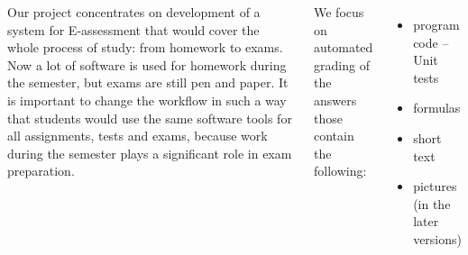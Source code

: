 \documentclass[25pt, 
               a0paper, 
               portraitmargin = 0mm, 
               margin = 0mm,
               innermargin = 50mm,
               blockverticalspace = 1mm,
               colspace = 40mm,
               subcolspace = 8mm]
               {tikzposter}
\begin{document}
 \vspace{1cm}
\begin{columns}
   
    {
		\LARGE
{Our project concentrates on development of a system
for E-assessment that would cover the whole process
of study: from homework to exams. Now a lot of
software is used for homework during the semester, but
exams are still pen and paper. It is important to change
the workflow in such a way that students would use the
same software tools for all assignments, tests and
exams, because work during the semester plays a
significant role in exam preparation.}
    }
    
    {
    





\LARGE

We focus on automated grading of the answers those
contain the following:
\begin{itemize}
\item program code -- Unit tests
\item formulas
\item short text
\item pictures (in the later versions)
\end{itemize}

}
\end{columns}
\end{document}
